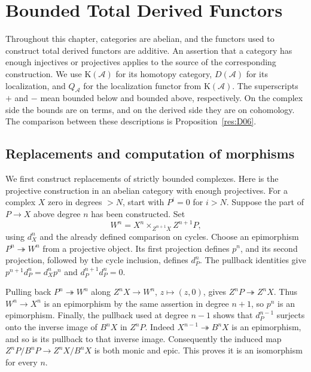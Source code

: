 \chapter{Bounded Total Derived Functors}
\label{ch:derived-functors}

Throughout this chapter, categories are abelian, and the functors used to
construct total derived functors are additive. An assertion that a category
has enough injectives or projectives applies to the source of the corresponding
construction. We use \(\mathrm K(\mathcal A)\) for its homotopy category,
\(D(\mathcal A)\) for its localization, and \(Q_{\mathcal A}\) for the
localization functor from \(\mathrm K(\mathcal A)\). The superscripts \(+\)
and \(-\) mean bounded below and bounded above, respectively. On the complex
side the bounds are on terms, and on the derived side they are on cohomology.
The comparison between these descriptions is Proposition~\ref{res:D06}.

\section{Replacements and computation of morphisms}

We first construct replacements of strictly bounded complexes. Here is the
projective construction in an abelian category with enough projectives.
For a complex \(X\) zero in degrees \(>N\), start with \(P^i=0\) for \(i>N\).
Suppose the part of \(P\to X\) above degree \(n\) has been constructed. Set
\[
  W^n=X^n\times_{Z^{n+1}X}Z^{n+1}P,
\]
using \(d_X^n\) and the already defined comparison on cycles. Choose an
epimorphism \(P^n\twoheadrightarrow W^n\) from a projective object. Its first
projection defines \(p^n\), and its second projection, followed by the cycle
inclusion, defines \(d_P^n\). The pullback identities give \(p^{n+1}d_P^n=d_X^np^n\)
and \(d_P^{n+1}d_P^n=0\).

Pulling back \(P^n\twoheadrightarrow W^n\) along \(Z^nX\to W^n\),
\(z\mapsto(z,0)\), gives \(Z^nP\twoheadrightarrow Z^nX\). Thus
\(W^n\to X^n\) is an epimorphism by the same assertion in degree \(n+1\),
so \(p^n\) is an epimorphism. Finally, the pullback used at degree \(n-1\)
shows that \(d_P^{n-1}\) surjects onto the inverse image of \(B^nX\) in
\(Z^nP\). Indeed \(X^{n-1}\twoheadrightarrow B^nX\) is an epimorphism,
and so is its pullback to that inverse image. Consequently the induced
map \(Z^nP/B^nP\to Z^nX/B^nX\) is both monic and epic. This proves it is an
isomorphism for every \(n\).

